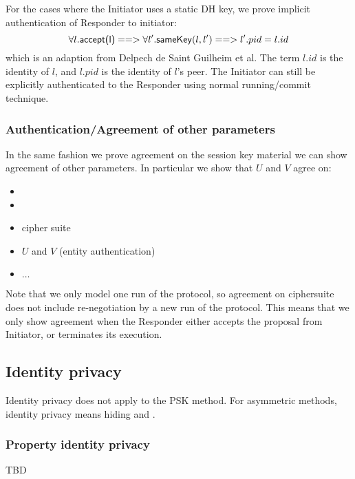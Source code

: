 \documentclass[a4paper,11pt]{article}
\theoremstyle{plain}
\theoremstyle{plain}
\begin{document}
For the cases where the Initiator uses a static DH key, we prove implicit
authentication of Responder to initiator:
$$
\forall l. \text{\textup{\textsf{accept(l)}}} ==>
    \forall l'. \text{\textup{\textsf{sameKey}}}(l, l') ==> l'.pid = l.id
$$
which is an adaption from Delpech de Saint Guilheim et al.
%
The term $l.id$ is the identity of $l$, and $l.pid$ is the identity of $l$'s
peer.
%
The Initiator can still be explicitly authenticated to the Responder using
normal running/commit technique.
%

\subsubsection{Authentication/Agreement of other parameters}
%
In the same fashion we prove agreement on the session key material we can show
agreement of other parameters.
%
In particular we show that $U$ and $V$ agree on:
\begin{itemize}
    \item {}
    \item {}
    \item cipher suite
    \item $U$ and $V$ (entity authentication)
    \item $\ldots$
\end{itemize}

Note that we only model one run of the protocol, so agreement on ciphersuite
does not include re-negotiation by a new run of the protocol.
%
This means that we only show agreement when the Responder either accepts the
proposal from Initiator, or terminates its execution.
%






\subsection{Identity privacy}
%
Identity privacy does not apply to the PSK method.
%
For asymmetric methods, identity privacy means hiding  and
.

\subsubsection{Property identity privacy}
TBD
\end{document}
